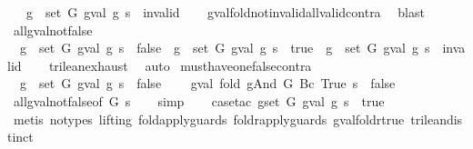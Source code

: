 \begin{isabellebody}
\ \ \ {\isasymforall}g\ {\isasymin}\ set\ G{\isachardot}\ gval\ g\ s\ {\isasymnoteq}\ invalid{\isachardoublequoteclose}\isanewline
%
\isadelimproof
\ \ %
\endisadelimproof
%
\isatagproof
{}\isamarkupfalse%
\ gval{\isacharunderscore}fold{\isacharunderscore}not{\isacharunderscore}invalid{\isacharunderscore}all{\isacharunderscore}valid{\isacharunderscore}contra\ \isamarkupfalse%
\ blast%
\endisatagproof
{\isafoldproof}%
%
\isadelimproof
\isanewline
%
\endisadelimproof
\isanewline
{}\isamarkupfalse%
\ all{\isacharunderscore}gval{\isacharunderscore}not{\isacharunderscore}false{\isacharcolon}\isanewline
\ \ {\isachardoublequoteopen}{\isacharparenleft}{\isasymforall}g\ {\isasymin}\ set\ G{\isachardot}\ gval\ g\ s\ {\isasymnoteq}\ false{\isacharparenright}\ {\isacharequal}\ {\isacharparenleft}{\isasymforall}g\ {\isasymin}\ set\ G{\isachardot}\ gval\ g\ s\ {\isacharequal}\ true{\isacharparenright}\ {\isasymor}\ {\isacharparenleft}{\isasymexists}g\ {\isasymin}\ set\ G{\isachardot}\ gval\ g\ s\ {\isacharequal}\ invalid{\isacharparenright}{\isachardoublequoteclose}\isanewline
%
\isadelimproof
\ \ %
\endisadelimproof
%
\isatagproof
{}\isamarkupfalse%
\ trilean{\isachardot}exhaust\ \isamarkupfalse%
\ auto%
\endisatagproof
{\isafoldproof}%
%
\isadelimproof
\isanewline
%
\endisadelimproof
\isanewline
{}\isamarkupfalse%
\ must{\isacharunderscore}have{\isacharunderscore}one{\isacharunderscore}false{\isacharunderscore}contra{\isacharcolon}\isanewline
\ \ {\isachardoublequoteopen}{\isasymforall}g\ {\isasymin}\ set\ G{\isachardot}\ gval\ g\ s\ {\isasymnoteq}\ false\ {\isasymLongrightarrow}\isanewline
\ \ \ gval\ {\isacharparenleft}fold\ gAnd\ G\ {\isacharparenleft}Bc\ True{\isacharparenright}{\isacharparenright}\ s\ {\isasymnoteq}\ false{\isachardoublequoteclose}\isanewline
%
\isadelimproof
\ \ %
\endisadelimproof
%
\isatagproof
{}\isamarkupfalse%
\ all{\isacharunderscore}gval{\isacharunderscore}not{\isacharunderscore}false{\isacharbrackleft}of\ G\ s{\isacharbrackright}\isanewline
\ \ \isamarkupfalse%
\ simp\isanewline
\ \ \isamarkupfalse%
\ {\isacharparenleft}case{\isacharunderscore}tac\ {\isachardoublequoteopen}{\isacharparenleft}{\isasymforall}g{\isasymin}set\ G{\isachardot}\ gval\ g\ s\ {\isacharequal}\ true{\isacharparenright}{\isachardoublequoteclose}{\isacharparenright}\isanewline
\ \ \ \isamarkupfalse%
\ {\isacharparenleft}metis\ {\isacharparenleft}no{\isacharunderscore}types{\isacharcomma}\ lifting{\isacharparenright}\ fold{\isacharunderscore}apply{\isacharunderscore}guards\ foldr{\isacharunderscore}apply{\isacharunderscore}guards\ gval{\isacharunderscore}foldr{\isacharunderscore}true\ trilean{\isachardot}distinct{\isacharparenleft}{}{\isacharparenright}{\isacharparenright}\isanewline

\end{isabellebody}
